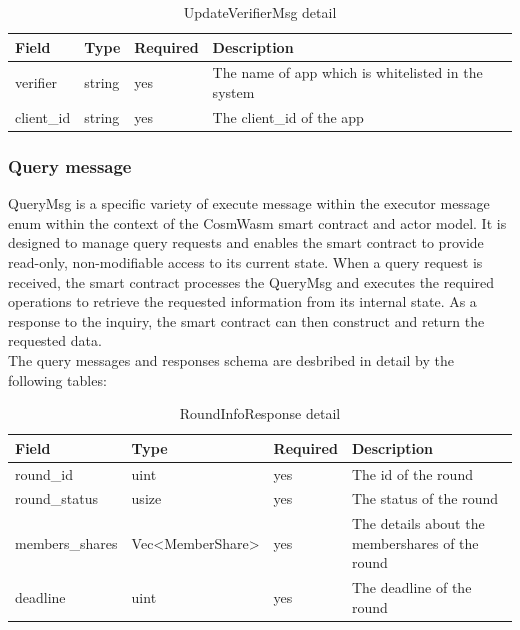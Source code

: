 \documentclass[../Main.tex]{subfiles}
\begin{document}
\begin{table}[H]
  \centering
  \begin{tabular}{|l|l|l|p{8cm}|}
\hline
\rowcolor[HTML]{F56B00}
\textbf{Field} & \textbf{Type} & \textbf{Required} & \textbf{Description}                               \\ \hline
verifier       & string        & yes               & The name of app which is whitelisted in the system \\ \hline
client\_id     & string        & yes               & The client\_id of the app                          \\ \hline
\end{tabular}
  \caption{UpdateVerifierMsg detail}
  \label{updateverifier-msg-detail}
\end{table}

\subsubsection{Query message}
QueryMsg is a specific variety of execute message within the executor message enum within the context of the CosmWasm smart contract and actor model. It is designed to manage query requests and enables the smart contract to provide read-only, non-modifiable access to its current state. When a query request is received, the smart contract processes the QueryMsg and executes the required operations to retrieve the requested information from its internal state. As a response to the inquiry, the smart contract can then construct and return the requested data. \\
\indent The query messages and responses schema are desbribed in detail by the following tables:\\
\begin{table}[H]
  \centering
  \begin{tabular}{|l|l|l|p{8cm}|}
\hline
\rowcolor[HTML]{F56B00}
\textbf{Field}  & \textbf{Type}                           & \textbf{Required} & \textbf{Description}                            \\ \hline
round\_id       & uint                                    & yes               & The id of the round                             \\ \hline
round\_status   & usize                                   & yes               & The status of the round                         \\ \hline
members\_shares & Vec\textless{}MemberShare\textgreater{} & yes               & The details about the membershares of the round \\ \hline
deadline        & uint                                    & yes               & The deadline of the round                       \\ \hline
\end{tabular}
  \caption{RoundInfoResponse detail}
  \label{roundinfo-response-detail}
\end{table}
\end{document}
